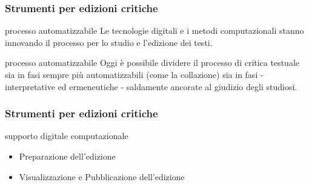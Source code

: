 %
%
%
%
%
%
%
%
%




\begin{frame}
	\frametitle{Strumenti per edizioni critiche}
	\addtocounter{nframe}{1}
    \begin{block}{processo automatizzabile}
       Le tecnologie digitali e i metodi computazionali stanno innovando il processo per lo studio e l'edizione dei testi.
    \end{block}
    \begin{block}{processo automatizzabile}
        Oggi è possibile dividere il processo di critica testuale sia in fasi sempre più automatizzabili (come la collazione) sia in fasi  - interpretative ed ermeneutiche - saldamente ancorate al giudizio degli studiosi.
     \end{block}
	
\end{frame}

\begin{frame}
	\frametitle{Strumenti per edizioni critiche}
	\addtocounter{nframe}{1}
   
    \begin{block}{supporto digitale computazionale}
        \begin{itemize}
            \item Preparazione dell'edizione
            \item Visualizzazione e Pubblicazione dell'edizione
        \end{itemize}
    \end{block}
	
\end{frame}


